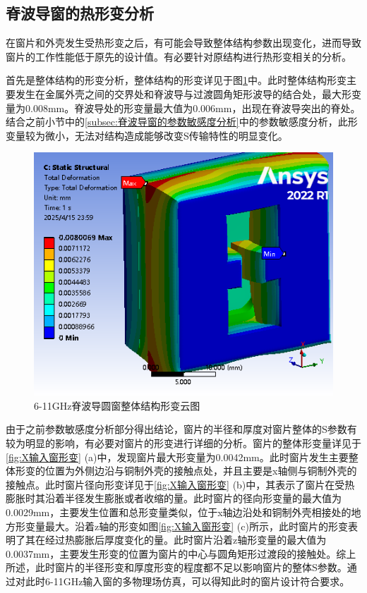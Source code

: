 \documentclass[master]{thesis-uestc}
\begin{document}
\subsection{脊波导窗的热形变分析}
在窗片和外壳发生受热形变之后，有可能会导致整体结构参数出现变化，进而导致窗片的工作性能低于原先的设计值。有必要针对原结构进行热形变相关的分析。

首先是整体结构的形变分析，整体结构的形变详见于图\ref{fig:X整体结构形变}中。此时整体结构形变主要发生在金属外壳之间的交界处和脊波导与过渡圆角矩形波导的结合处，最大形变量为0.008mm。脊波导处的形变量最大值为0.006mm，出现在脊波导突出的脊处。结合之前小节中的\ref{subsec:脊波导窗的参数敏感度分析}中的参数敏感度分析，此形变量较为微小，无法对结构造成能够改变S传输特性的明显变化。
\begin{figure}[!htb]
    \centering
    \includegraphics[width=0.4\linewidth]{pic/chapter3/X输入窗与波导.png}
    \caption{6-11GHz脊波导圆窗整体结构形变云图}
    \label{fig:X整体结构形变}
\end{figure}

由于之前参数敏感度分析部分得出结论，窗片的半径和厚度对窗片整体的S参数有较为明显的影响，有必要对窗片的形变进行详细的分析。窗片的整体形变量详见于\ref{fig:X输入窗形变} (a)中，发现窗片最大形变量为0.0042mm。此时窗片发生主要整体形变的位置为外侧边沿与铜制外壳的接触点处，并且主要是x轴侧与铜制外壳的接触点。此时窗片径向形变详见于\ref{fig:X输入窗形变} (b)中，其表示了窗片在受热膨胀时其沿着半径发生膨胀或者收缩的量。此时窗片的径向形变量的最大值为0.0029mm，主要发生位置和总形变量类似，位于x轴边沿处和铜制外壳相接处的地方形变量最大。沿着z轴的形变如图\ref{fig:X输入窗形变} (c)所示，此时窗片的形变表明了其在经过热膨胀后厚度变化的量。此时窗片沿着z轴形变量的最大值为0.0037mm，主要发生形变的位置为窗片的中心与圆角矩形过渡段的接触处。综上所述，此时窗片的半径形变和厚度形变的程度都不足以影响窗片的整体S参数。通过对此时6-11GHz输入窗的多物理场仿真，可以得知此时的窗片设计符合要求。
\end{document}
